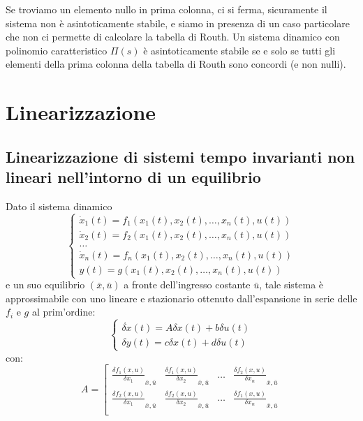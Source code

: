 \begin{landscape}
\begin{multicols*}{3}
    Se troviamo un elemento nullo in prima colonna, ci si ferma, sicuramente il sistema non è asintoticamente stabile, e siamo in presenza di un caso particolare che non ci permette di calcolare la tabella di Routh.\newline
    \newline
    Un sistema dinamico con polinomio caratteristico $\Pi(s)$ è asintoticamente stabile se e solo se tutti gli elementi della prima colonna della tabella di Routh sono concordi (e non nulli).
    \newpage\section{Linearizzazione}
    \subsection{Linearizzazione di sistemi tempo invarianti non lineari nell'intorno di un equilibrio}
    Dato il sistema dinamico 
    \[
        \begin{cases}
            \dot{x}_1(t) = f_1(x_1(t),x_2(t),\dots,x_n(t),u(t))\\
            \dot{x}_2(t) = f_2(x_1(t),x_2(t),\dots,x_n(t),u(t))\\
            \dots\\
            \dot{x}_n(t) = f_n(x_1(t),x_2(t),\dots,x_n(t),u(t))\\
            y(t) = g(x_1(t),x_2(t),\dots,x_n(t),u(t))
        \end{cases}
    \]
    e un suo equilibrio $(\bar{x}, \bar{u})$ a fronte dell'ingresso costante $\bar{u}$, tale sistema è approssimabile con uno lineare e stazionario ottenuto dall'espansione in serie delle $f_i$ e $g$ al prim'ordine:
    \[
        \begin{cases}
            \dot{\delta x} (t) = A \delta x(t) + b \delta u(t)\\
            \delta y (t) = c \delta x (t) + d \delta u (t)
        \end{cases}
    \]
    con:
    \[
        A = \left[\begin{matrix}
            \frac{\delta f_1 (x,u)}{\delta x_1}_{\bar{x}, \bar{u}} & \frac{\delta f_1 (x,u)}{\delta x_2}_{\bar{x}, \bar{u}} & \dots & \frac{\delta f_2 (x,u)}{\delta x_n}_{\bar{x}, \bar{u}}\\
            \frac{\delta f_2(x,u)}{\delta x_1}_{\bar{x}, \bar{u}} & \frac{\delta f_2(x,u)}{\delta x_2}_{\bar{x}, \bar{u}} & \dots & \frac{\delta f_1(x,u)}{\delta x_n}_{\bar{x}, \bar{u}}\\

\end{matrix}\]
\end{multicols*}
\end{landscape}
